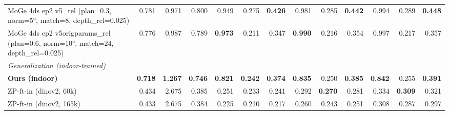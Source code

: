 \begin{table}[t]
{\begin{tabular}{l r r r r r r r r r r r r}
MoGe 4ds ep2 v5\_rel (plan=0.3, norm=5°, match=8, depth\_rel=0.025) & 0.781 & 0.971 & 0.800 & 0.949 & 0.275 & \textbf{0.426} & 0.981 & 0.285 & \textbf{0.442} & 0.994 & 0.289 & \textbf{0.448} \\
MoGe 4ds ep2 v5origparams\_rel (plan=0.6, norm=10°, match=24, depth\_rel=0.025) & 0.776 & 0.987 & 0.789 & \textbf{0.973} & 0.211 & 0.347 & \textbf{0.990} & 0.216 & 0.354 & 0.997 & 0.217 & 0.357 \\
\midrule
\multicolumn{13}{l}{\textit{Generalization (indoor-trained)}} \\
\textbf{Ours (indoor)} & \textbf{0.718} & \textbf{1.267} & \textbf{0.746} & \textbf{0.821} & \textbf{0.242} & \textbf{0.374} & \textbf{0.835} & 0.250 & \textbf{0.385} & \textbf{0.842} & 0.255 & \textbf{0.391} \\
ZP-ft-in (dinov2, 60k) & 0.434 & 2.675 & 0.385 & 0.251 & 0.233 & 0.241 & 0.292 & \textbf{0.270} & 0.281 & 0.334 & \textbf{0.309} & 0.321 \\
ZP-ft-in (dinov2, 165k) & 0.433 & 2.675 & 0.384 & 0.225 & 0.210 & 0.217 & 0.260 & 0.243 & 0.251 & 0.308 & 0.287 & 0.297 \\
\bottomrule
\end{tabular}%
}
\end{table}